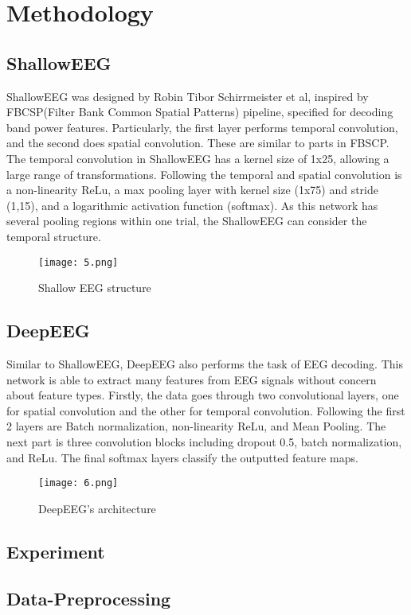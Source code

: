 \documentclass[]{report}
\begin{document}
\chapter*{Methodology}
\section{ShallowEEG}
ShallowEEG \cite{schirrmeister2017} was designed by Robin Tibor Schirrmeister et al, inspired by FBCSP(Filter Bank Common Spatial Patterns) pipeline, specified for decoding band power features. Particularly, the first layer performs temporal convolution, and the second does spatial convolution. These are similar to parts in FBSCP. The temporal convolution in ShallowEEG has a kernel size of 1x25, allowing a large range of transformations. Following the temporal and spatial convolution is a non-linearity ReLu, a max pooling layer with kernel size (1x75) and stride (1,15), and a logarithmic activation function (softmax). As this network has several pooling regions within one trial, the ShallowEEG can consider the temporal structure.
\begin{figure}[H]
    \centering
    \texttt{[image: 5.png]}
    \caption{Shallow EEG structure}
    \label{fig:enter-label}
\end{figure}
\section{DeepEEG}
Similar to ShallowEEG, DeepEEG\cite{cooney2019} also performs the task of EEG decoding. This network is able to extract many features from EEG signals without concern about feature types. Firstly, the data goes through two convolutional layers, one for spatial convolution and the other for temporal convolution. Following the first 2 layers are Batch normalization, non-linearity ReLu, and Mean Pooling. The next part is three convolution blocks including dropout 0.5, batch normalization, and ReLu. The final softmax layers classify the outputted feature maps. 
\begin{figure}[H]
    \centering
    \texttt{[image: 6.png]}
    \caption{DeepEEG's architecture}
    \label{fig:enter-label}
\end{figure}
\newpage
\section{Experiment}
\section{Data-Preprocessing}
\end{document}

